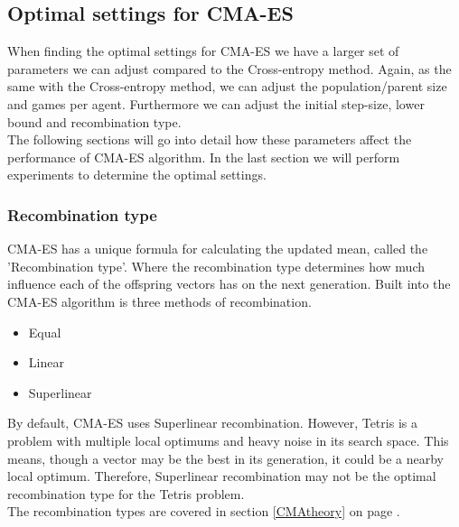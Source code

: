 \subsection{Optimal settings 
for CMA-ES \label{optimalsettingscma}}

When finding the optimal settings for CMA-ES we have a larger set of parameters we can adjust compared
to the Cross-entropy method. Again, as the same with the Cross-entropy method, we can adjust the population/parent size and
games per agent. Furthermore we can adjust the initial step-size, lower bound and recombination type.\\
The following sections will go into detail how these parameters affect the performance of CMA-ES
algorithm. In the last section we will perform experiments to determine the optimal settings.


\subsubsection{Recombination type}
CMA-ES has a unique formula for calculating the updated mean,
called the 'Recombination type'. Where the recombination type
determines how much influence each of the offspring vectors has on the next
generation. Built into the CMA-ES algorithm is three methods of recombination. 
\begin{itemize}
\item Equal
\item Linear
\item Superlinear
\end{itemize}
By default, CMA-ES uses Superlinear recombination. However, Tetris is a problem
with multiple local optimums and heavy noise in its search space. This means, though a vector may be the best in its generation, it could be a nearby local optimum. Therefore, Superlinear recombination may not be the optimal recombination type for the Tetris problem.\\

The recombination types are covered in section \ref{CMAtheory} on 
page \pageref{eq:recomType}.


